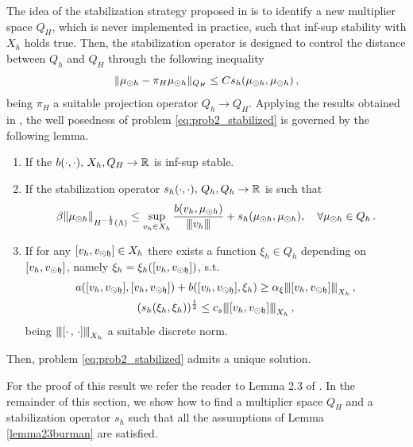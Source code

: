 \documentclass[r]{siamart171218}
\begin{document}
The idea of the stabilization strategy proposed in \cite{burman2014}
is to identify a new multiplier space $Q_H$, which is never implemented in practice, such that inf-sup stability with $X_h$ holds true. Then, the stabilization operator is designed to control the distance between $Q_h$ and $Q_H$ through the following inequality
\begin{equation*}
    \|\mu_{\odot h} - \pi_H \mu_{\odot h}\|_{Q_H} \leq C s_h(\mu_{\odot h}, \mu_{\odot h})\,,
\end{equation*}
being $\pi_H$ a suitable projection operator $Q_h \rightarrow Q_H$. Applying the results obtained in \cite{burman2014}, the well posedness of problem \eqref{eq:prob2_stabilized} is governed by the following lemma.
\begin{lemma}\label{lemma23burman}
\begin{enumerate}
    \item If the $b(\cdot,\cdot),\, X_h,Q_H \rightarrow \mathbb{R}$ is inf-sup stable.
    \item If the stabilization operator $s_h(\cdot,\cdot),\, Q_h,Q_h \rightarrow \mathbb{R}$ is such that
    \begin{equation*}
        \beta \|\mu_{\odot h}\|_{H^{-\frac12}(\Lambda)} \leq \sup\limits_{v_h \in X_h} \frac{b(v_h,\mu_{\odot h})}{{\left\vert\kern-0.25ex\left\vert\kern-0.25ex\left\vert v_h \right\vert\kern-0.25ex\right\vert\kern-0.25ex\right\vert}} + s_h(\mu_{\odot h}, \mu_{\odot h}), \quad \forall \mu_{\odot h} \in Q_h\,.
    \end{equation*}
    \item If for any $[v_h, v_{\odot \mathfrak{h}}] \in X_h$ there exists a function $\xi_h\in Q_h$ depending on $[v_h, v_{\odot \mathfrak{h}}]$, namely $\xi_h=\xi_h([v_h, v_{\odot \mathfrak{h}}])$, s.t.
\begin{gather}
\label{stab_coercivity}
a([v_h, \vdfh],[v_h, \vdfh] ) + b([v_h, \vdfh], \xi_h) \geq \alpha_\xi \vertiii{[v_h, \vdfh]}_{X_h}\,,
\\
\label{stab_stability}
(s_h(\xi_{h}, \xi_{h}))^{\frac 12} \leq c_s \vertiii{[v_h, \vdfh]}_{X_h}\,,
\end{gather}
being ${\left\vert\kern-0.25ex\left\vert\kern-0.25ex\left\vert [\cdot \, ,\, \cdot]  \right\vert\kern-0.25ex\right\vert\kern-0.25ex\right\vert}_{X_h}$ a suitable discrete norm. 
\end{enumerate}
Then, problem \eqref{eq:prob2_stabilized} admits a unique solution.
\end{lemma}
For the proof of this result we refer the reader to Lemma 2.3 of \cite{burman2014}. In the remainder of this section, we show how to find a multiplier space $Q_H$ and a stabilization operator $s_h$ such that all the assumptions of Lemma \ref{lemma23burman} are satisfied.
\end{document}
